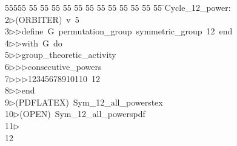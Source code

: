 %
%
\begin{tabbing}
55555 \= 55 \= 55 \= 55 \= 55 \= 55 \= 55 \= 55 \= 55 \= 55 \= 55 \= 55 \= 55 \= \>Cycle\_12\_power:\\[0pt]
2\>$\triangleright$\>(ORBITER)\ v\ 5\ \\[0pt]
3\>$\triangleright$\>$\triangleright$\>define\ G\ permutation\_group\ symmetric\_group\ 12\ end\ \\[0pt]
4\>$\triangleright$\>$\triangleright$\>with\ G\ do\ \\[0pt]
5\>$\triangleright$\>$\triangleright$\>group\_theoretic\_activity\ \\[0pt]
6\>$\triangleright$\>$\triangleright$\>$\triangleright$\>consecutive\_powers\ \\[0pt]
7\>$\triangleright$\>$\triangleright$\>$\triangleright$\>12345678910110\ 12\ \\[0pt]
8\>$\triangleright$\>$\triangleright$\>end\\[0pt]
9\>$\triangleright$\>(PDFLATEX)\ Sym\_12\_all\_powerstex\\[0pt]
10\>$\triangleright$\>(OPEN)\ Sym\_12\_all\_powerspdf\\[0pt]
11\>$\triangleright$\>\\[0pt]
12\>\end{tabbing}
